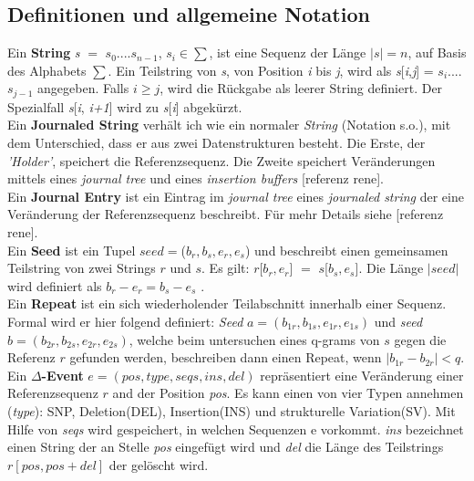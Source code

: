 \documentclass[12pt]{article}
\begin{document}
\subsection{Definitionen und allgemeine Notation}
\label{sec:definitions}
Ein \textbf{String} \textit{s} $=$ $s_{0}$....$s_{n-1}$, $ s_{i} \in \sum$, ist eine Sequenz der Länge $|s| = n$, auf Basis des Alphabets $\sum$. Ein Teilstring von \textit{s}, von Position \textit{i} bis \textit{j}, wird als \textit{s}[\textit{i},\textit{j}] = $s_{i}$....$s_{j-1}$ angegeben. Falls $i\ge j$, wird die Rückgabe als leerer String definiert. Der Spezialfall \textit{s}[\textit{i}, \textit{i+1}] wird zu \textit{s}[\textit{i}] abgekürzt.  \\

Ein \textbf{Journaled String} verhält ich wie ein normaler \textit{String} (Notation s.o.), mit dem Unterschied, dass er aus zwei Datenstrukturen besteht. Die Erste, der \textit{'Holder'}, speichert die Referenzsequenz. Die Zweite speichert Veränderungen mittels eines \textit{journal tree} und eines \textit{insertion buffers} [referenz rene].\\

Ein \textbf{Journal Entry} ist ein Eintrag im \textit{journal tree} eines \textit{journaled string} der eine Veränderung der Referenzsequenz beschreibt. Für mehr Details siehe [referenz rene].\\

Ein \textbf{Seed} ist ein Tupel $seed=$($b_{r},b_{s},e_{r},e_{s}$) und beschreibt einen gemeinsamen Teilstring von zwei Strings $r$ und $s$. Es gilt: $r$[$b_{r},e_{r}$] $=$ $s$[$b_{s},e_{s}$]. Die Länge $|seed|$ wird definiert als $b_{r}-e_{r} = b_{s}-e_{s}$ .\\

Ein \textbf{Repeat} ist ein sich wiederholender Teilabschnitt innerhalb einer Sequenz. Formal wird er hier folgend definiert: \textit{Seed} $a = (b_{1r},b_{1s},e_{1r},e_{1s})$ und \textit{seed} $b=(b_{2r},b_{2s},e_{2r},e_{2s})$, welche beim untersuchen eines q-grams von $s$ gegen die Referenz $r$ gefunden werden, beschreiben dann einen Repeat, wenn $|b_{1r} - b_{2r}| < q $. \\

Ein \textbf{$\Delta$-Event} $e = (pos,type,seqs,ins,del)$ repräsentiert eine Veränderung einer Referenzsequenz $r$ and der Position \textit{pos}. Es kann einen von vier Typen annehmen (\textit{type}): SNP, Deletion(DEL), Insertion(INS) und strukturelle Variation(SV). Mit Hilfe von \textit{seqs} wird gespeichert, in welchen Sequenzen e vorkommt. \textit{ins} bezeichnet einen String der an Stelle \textit{pos} eingefügt wird und \textit{del} die Länge des Teilstrings $r[pos,pos+del]$ der gelöscht wird.\\
\end{document}
